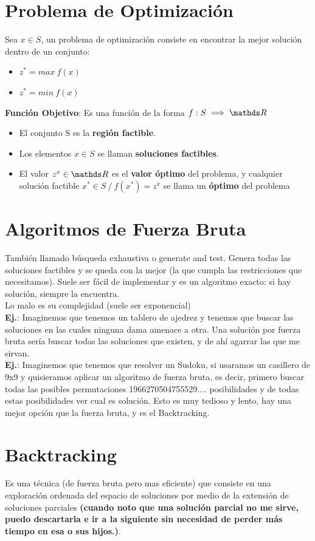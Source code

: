 \documentclass[10pt,a4paper]{article}
\begin{document}
\section*{Problema de Optimización}
Sea $x \in S$, un problema de optimización consiste en encontrar la mejor solución dentro de un conjunto: 
\begin{itemize}
    \item $z^{*} = max \ f(x)$
    \item $z^{*} = min \ f(x)$
\end{itemize}
\textbf{Función Objetivo}: Es una función de la forma $f:S\implies \float$
\begin{itemize}
    \item El conjunto S es la \textbf{región factible}.
    \item Los elementos $x \in S$ se llaman \textbf{soluciones factibles}.
    \item El valor $z^{x} \in \float$ es el \textbf{valor óptimo} del problema, y cualquier solución factible $x^{*} \in S \ / \ f(x^{*}) = z^{x}$ se llama un \textbf{óptimo} del problema
\end{itemize}
\section*{Algoritmos de Fuerza Bruta}
También llamado búsqueda exhaustiva o generate and test. Genera todas las soluciones factibles y se queda con la mejor (la que cumpla las restricciones que necesitamos). Suele ser fácil de implementar y es un algoritmo exacto: si hay solución, siempre la encuentra. \\
Lo malo es su complejidad (suele ser exponencial) \\

\textbf{Ej.}: Imaginemos que tenemos un tablero de ajedrez y tenemos que buscar las soluciones en las cuales ninguna dama amenace a otra. Una solución por fuerza bruta sería buscar todas las soluciones que existen, y de ahí agarrar las que me sirvan. \\ 

\textbf{Ej.}: Imaginemos que tenemos que resolver un Sudoku, si usaramos un casillero de 9x9 y quisieramos aplicar un algoritmo de fuerza bruta, es decir, primero buscar todas las posibles permutaciones 1966270504755529.... posibilidades y de todas estas posibilidades ver cual es solución. Esto es muy tedioso y lento, hay una mejor opción que la fuerza bruta, y es el Backtracking.
\section*{Backtracking}
Es una técnica (de fuerza bruta pero mas eficiente) que consiste en una exploración ordenada del espacio de soluciones por medio de la extensión de soluciones parciales \textbf{(cuando noto que una solución parcial no me sirve, puedo descartarla e ir a la siguiente sin necesidad de perder más tiempo en esa o sus hijos.)}. \\
\end{document}
